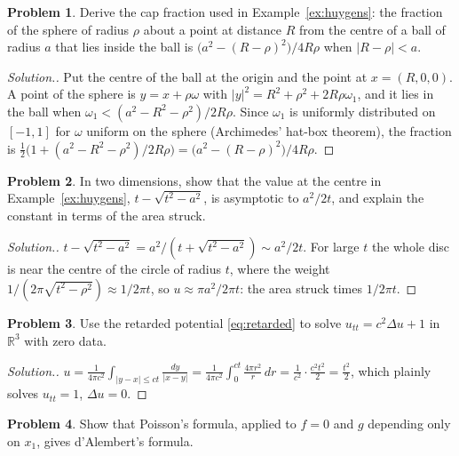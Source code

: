 \documentclass[11pt,a4paper]{article}
\numberwithin{equation}{section}
\theoremstyle{definition}
\newtheorem{problemx}{Problem}[subsection]
\newenvironment{problem}{\begin{problemx}}{\end{problemx}}
\newenvironment{solution}
  {\renewcommand{\qedsymbol}{}\begin{proof}[\textit{Solution}.]}
  {\end{proof}}
\begin{document}
\begin{problem}
Derive the cap fraction used in Example~\ref{ex:huygens}: the fraction of the sphere of radius $\rho$ about a point at distance $R$ from the centre of a ball of radius $a$ that lies inside the ball is $\bigl(a^2 - (R - \rho)^2\bigr)/4R\rho$ when $|R - \rho| < a$.
\end{problem}

\begin{solution}
Put the centre of the ball at the origin and the point at $x = (R, 0, 0)$. A point of the sphere is $y = x + \rho\omega$ with $|y|^2 = R^2 + \rho^2 + 2R\rho\omega_1$, and it lies in the ball when
$\omega_1 < (a^2 - R^2 - \rho^2)/2R\rho$. Since $\omega_1$ is uniformly distributed on $[-1, 1]$ for $\omega$ uniform on the sphere (Archimedes' hat-box theorem), the fraction is $\frac12\bigl(1 + (a^2 - R^2 - \rho^2)/2R\rho\bigr) = \bigl(a^2 - (R - \rho)^2\bigr)/4R\rho$.
\end{solution}

\begin{problem}
In two dimensions, show that the value at the centre in Example~\ref{ex:huygens}, $t - \sqrt{t^2 - a^2}$, is asymptotic to $a^2/2t$, and explain the constant in terms of the area struck.
\end{problem}

\begin{solution}
$t - \sqrt{t^2 - a^2} = a^2/(t + \sqrt{t^2 - a^2}) \sim a^2/2t$. For large $t$ the whole disc is near the centre of the circle of radius $t$, where the weight $1/(2\pi\sqrt{t^2 - \rho^2}) \approx 1/2\pi t$, so $u \approx \pi a^2/2\pi t$: the area struck times $1/2\pi t$.
\end{solution}

\begin{problem}
Use the retarded potential \eqref{eq:retarded} to solve $u_{tt} = c^2\Delta u + 1$ in $\mathbb R^3$ with zero data.
\end{problem}

\begin{solution}
$u = \frac1{4\pi c^2}\int_{|y - x| \leq ct}\frac{dy}{|x - y|} = \frac1{4\pi c^2}\int_0^{ct}\frac{4\pi r^2}{r}\,dr = \frac{1}{c^2}\cdot\frac{c^2t^2}{2} = \frac{t^2}{2}$, which plainly solves $u_{tt} = 1$, $\Delta u = 0$.
\end{solution}

\begin{problem}
\label{prob:descent}
Show that Poisson's formula, applied to $f = 0$ and $g$ depending only on $x_1$, gives d'Alembert's formula.
\end{problem}
\end{document}
